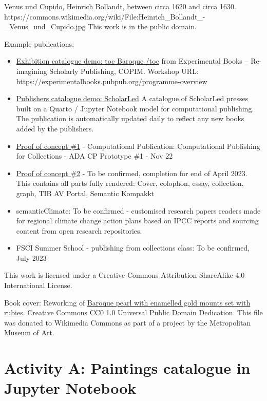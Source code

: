 \documentclass[
  letterpaper,
]{book}
\begin{document}
Venus und Cupido, Heinrich Bollandt, between circa 1620 and circa 1630.
https://commons.wikimedia.org/wiki/File:Heinrich\_Bollandt\_-\_Venus\_und\_Cupido.jpg
This work is in the public domain.

Example publications:

\begin{itemize}
\item
  \href{https://nfdi4culture.github.io/experimental-books-workshop/}{Exhibition
  catalogue demo: toc Baroque /toc} from Experimental Books --
  Re-imagining Scholarly Publishing, COPIM. Workshop URL:
  https://experimentalbooks.pubpub.org/programme-overview
\item
  \href{https://simonxix.github.io/scholarled_catalogue/}{Publishers
  catalogue demo: ScholarLed} A catalogue of ScholarLed presses built on
  a Quarto / Jupyter Notebook model for computational publishing. The
  publication is automatically updated daily to reflect any new books
  added by the publishers.
\item
  \href{https://nfdi4culture.github.io/cp4c/}{Proof of concept \#1} -
  Computational Publication: Computational Publishing for Collections -
  ADA CP Prototype \#1 - Nov 22
\item
  \href{https://nfdi4culture.github.io/art_catalogue_test/}{Proof of
  concept \#2} - To be confirmed, completion for end of April 2023. This
  contains all parts fully rendered: Cover, colophon, essay, collection,
  graph, TIB AV Portal, Semantic Kompakkt
\item
  semanticClimate: To be confirmed - customised research papers readers
  made for regional climate change action plans based on IPCC reports
  and sourcing content from open research repositories.
\item
  FSCI Summer School - publishing from collections class: To be
  confirmed, July 2023
\end{itemize}

This work is licensed under a Creative Commons Attribution-ShareAlike
4.0 International License.

Book cover: Reworking of
\href{https://en.wikipedia.org/wiki/File:Pendant_in_the_form_of_a_siren_MET_DT7173.jpg}{Baroque
pearl with enamelled gold mounts set with rubies}. Creative Commons CC0
1.0 Universal Public Domain Dedication. This file was donated to
Wikimedia Commons as part of a project by the Metropolitan Museum of
Art.


\hypertarget{activity-a-paintings-catalogue-in-jupyter-notebook}{%
\chapter{Activity A: Paintings catalogue in Jupyter
Notebook}\label{activity-a-paintings-catalogue-in-jupyter-notebook}}
\end{document}
